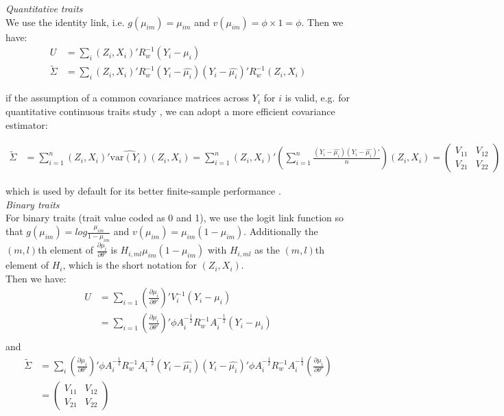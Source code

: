\documentclass[compress]{beamer}
\begin{document}
{\newpage
\textit{Quantitative traits}\\
\indent We use the identity link, i.e. $g(\mu_{im}) = \mu_{im}$ and $v(\mu_{im}) = \phi \times 1 = \phi$. Then we have:
\begin{align}
U & = \sum_{i}\left(Z_{i},X_{i}\right)' R_w^{-1} (Y_{i}-\mu_{i}) \nonumber\\
\widetilde{\Sigma} & = \sum_{i}\left(Z_{i},X_{i}\right)' R_w^{-1} (Y_{i}-\hat{\mu_{i}})(Y_{i}-\hat{\mu_{i}})' R_w^{-1} \left(Z_{i},X_{i}\right)
\label{eq:2}
\end{align}

if the assumption of a common covariance matrices across $Y_i$ for $i$ is valid, e.g. for quantitative continuous traits study \cite{pan2001robust}, we can adopt a more efficient covariance estimator:
\begin{tiny}
\begin{align*}
\widetilde{\Sigma} & = \sum_{i=1}^n \left(Z_{i},X_{i}\right)'\widehat{\textrm{var}(Y_{i})}\left(Z_{i},X_{i}\right)
 = \sum_{i=1}^n \left(Z_{i},X_{i}\right)'\left(\sum_{i=1}^n \frac{(Y_{i}-\hat{\mu_{i}})(Y_{i}-\hat{\mu_{i}})'}{n}\right)\left(Z_{i},X_{i}\right) = 
\begin{pmatrix}
V_{11} & V_{12}\\
 V_{21} & V_{22}
\end{pmatrix}
\end{align*}
\end{tiny}
which is used by default for its better finite-sample performance \cite{pan2001robust}.\\

\framebreak
\textit{Binary traits}\\
\indent For binary traits (trait value coded as 0 and 1), we use the logit link function so that $g(\mu_{im}) = log \frac{\mu_{im}}{1 - \mu_{im}}$ and $v(\mu_{im}) = \mu_{im} (1 - \mu_{im})$. Additionally the $(m, l)$th element of $\frac{\partial\mu_{i}}{\partial\theta'}$ is
$
H_{i,ml} \mu_{im} (1- \mu_{im})
$
with $H_{i,ml}$ as the $(m, l)$th element of $H_i$, which is the short notation for $(Z_{i},X_{i})$.\\
Then we have:
\begin{align*}
U & = \sum_{i=1} (\frac{\partial\mu_{i}}{\partial\theta'})' V_i^{-1} (Y_{i}-\mu_{i})\\
& = \sum_{i=1} (\frac{\partial\mu_{i}}{\partial\theta'})' \phi A_{i}^{-\frac{1}{2}} R_{w}^{-1} A_{i}^{-\frac{1}{2}} (Y_{i}-\mu_{i})\\
\end{align*}
and
\begin{align*}
\widetilde{\Sigma} & = \sum_{i}\left(\frac{\partial\mu_{i}}{\partial\theta'}\right)' \phi A_{i}^{-\frac{1}{2}} R_{w}^{-1} A_{i}^{-\frac{1}{2}} (Y_{i}-\hat{\mu_{i}}) (Y_{i}-\hat{\mu_{i}})' \phi A_{i}^{-\frac{1}{2}} R_{w}^{-1} A_{i}^{-\frac{1}{2}} \left( \frac{\partial\mu_{i}}{\partial\theta'} \right)\\
& = 
\begin{pmatrix}
V_{11} & V_{12}\\
 V_{21} & V_{22}
\end{pmatrix}
\end{align*}

}
\end{document}
